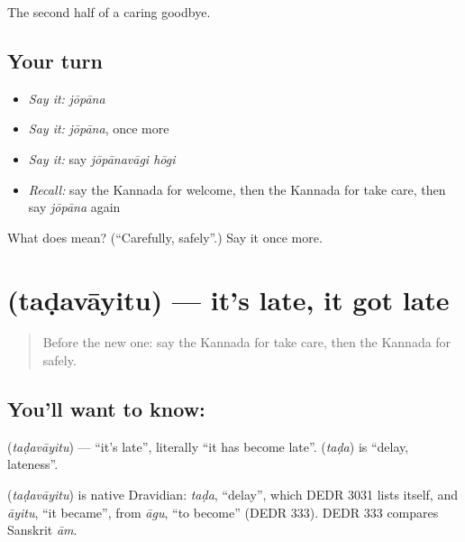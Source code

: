 \begin{grammarlens}[title={What you've built}]
The second half of a caring goodbye.
\end{grammarlens}

\subsection*{Your turn}
\begin{itemize}
\raggedright
  \item \emph{Say it:} \emph{jōpāna}
  \item \emph{Say it:} \emph{jōpāna}, once more
  \item \emph{Say it:} say \emph{jōpānavāgi hōgi}
  \item \emph{Recall:} say the Kannada for welcome, then the Kannada for take care, then say \emph{jōpāna} again
\end{itemize}

\begin{tcolorbox}[breakable,colback=teal!4,colframe=teal!35!black,title={Before you move on}]
What does  mean? (\textquotedblleft{}Carefully, safely\textquotedblright{}.) Say it once more.
\end{tcolorbox}
\section[\texorpdfstring{\kn{ತಡವಾಯಿತು} (taḍavāyitu)}{ತಡವಾಯಿತು (taḍavāyitu)}]{ (taḍavāyitu) — it's late, it got late}

\label{lesson:KA-C89-late}



\begin{quote}
Before the new one: say the Kannada for take care, then the Kannada for safely.
\end{quote}

\subsection*{You'll want to know: }
\textbf{} (\emph{taḍavāyitu}) — \textquotedblleft{}it's late\textquotedblright{}, literally \textquotedblleft{}it has become late\textquotedblright{}. \textbf{} (\emph{taḍa}) is \textquotedblleft{}delay, lateness\textquotedblright{}.

\begin{cousinweb}
\textbf{} (\emph{taḍavāyitu}) is native Dravidian: \emph{taḍa}, \textquotedblleft{}delay\textquotedblright{}, which DEDR 3031 lists itself, and \emph{āyitu}, \textquotedblleft{}it became\textquotedblright{}, from \emph{āgu}, \textquotedblleft{}to become\textquotedblright{} (DEDR 333). DEDR 333 compares Sanskrit \emph{ām}.
\end{cousinweb}

